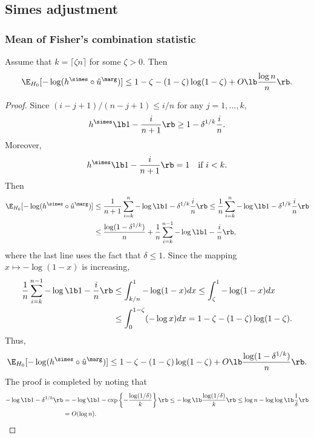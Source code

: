 \subsection{Simes adjustment}
\subsubsection{Mean of Fisher's combination statistic}
\begin{thm}\label{thm:fisher_simes}
  Assume that $k = \lceil\zeta n\rceil$ for some $\zeta > 0$. Then
  \[\E_{H_0}[-\log (h^\simes \circ \hat{u}^\marg)] \le 1 - \zeta - (1 - \zeta)\log (1 - \zeta) + O\lb\frac{\log n}{n}\rb.\]
\end{thm}
\begin{proof}
  Since $(i - j + 1) / (n - j + 1)\le i / n$ for any $j = 1, \ldots, k$,
  \[h^\simes\lb 1 - \frac{i}{n+1}\rb\ge 1 - \delta^{1/k}\frac{i}{n}.\]
  Moreover,
  \[h^\simes\lb 1 - \frac{i}{n+1}\rb = 1\quad \text{if }i < k.\]
  Then
  \begin{align*}
    \E_{H_0}[-\log (h^\simes \circ \hat{u}^\marg)]
    &\le \frac{1}{n+1}\sum_{i=k}^{n}-\log\lb 1 - \delta^{1/k}\frac{i}{n}\rb\le \frac{1}{n}\sum_{i=k}^{n}-\log\lb 1 - \delta^{1/k}\frac{i}{n}\rb\\
    & \le \frac{\log (1-\delta^{1/k})}{n} + \frac{1}{n}\sum_{i=k}^{n-1}-\log\lb 1 - \frac{i}{n}\rb,
  \end{align*}
  where the last line uses the fact that $\delta \le 1$. Since the mapping $x\mapsto -\log(1 - x)$ is increasing,
  \begin{align*}
    \frac{1}{n}\sum_{i=k}^{n-1}-\log\lb 1 - \frac{i}{n}\rb &\le \int_{k/n}^{1}-\log(1 - x)dx \le \int_{\zeta}^{1}-\log(1 - x)dx\\
                                                           & \le \int_{0}^{1 - \zeta}(-\log x)dx = 1 - \zeta - (1 - \zeta)\log (1 - \zeta).
  \end{align*}
  Thus,
  \[\E_{H_0}[-\log (h^\simes \circ \hat{u}^\marg)]\le 1 - \zeta - (1 - \zeta)\log (1 - \zeta) + O\lb \frac{\log(1 - \delta^{1/k})}{n}\rb.\]
  The proof is completed by noting that
  \begin{align}
    -\log\lb 1 - \delta^{1/k}\rb & = -\log\lb 1 - \exp\left\{-\frac{\log (1 / \delta)}{k}\right\}\rb \le -\log\lb \frac{\log (1 / \delta)}{k}\rb\le \log n - \log\log\lb\frac{1}{\delta}\rb\label{eq:simes_max}\\
    & = O(\log n)\nonumber.
  \end{align}
\end{proof}

